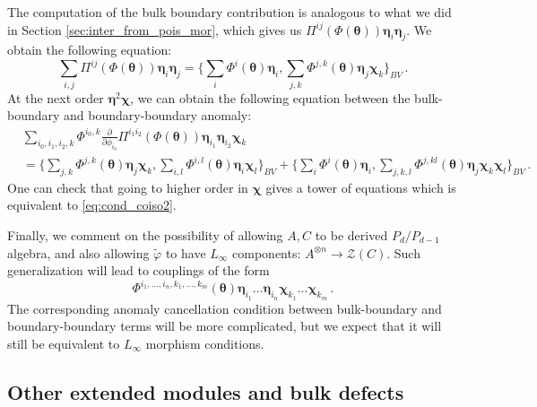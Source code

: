 \documentclass[11pt]{article}
\numberwithin{equation}{section}
\begin{document}
The computation of the bulk boundary contribution is analogous to what we did in Section \ref{sec:inter_from_pois_mor}, which gives us $\Pi^{ij}(\Phi(\boldsymbol{\theta}))\boldsymbol{\eta}_i\boldsymbol{\eta}_j$. We obtain the following equation:
\begin{equation}
	\sum_{i,j}\Pi^{ij}(\Phi(\boldsymbol{\theta}))\boldsymbol{\eta}_i\boldsymbol{\eta}_j = \{\sum_{i}\Phi^i(\boldsymbol{\theta})\boldsymbol{\eta}_i, \sum_{j,k}\Phi^{j,k}(\boldsymbol{\theta})\boldsymbol{\eta}_j\boldsymbol{\chi}_k\}_{BV}\,.
\end{equation}
At the next order $\boldsymbol{\eta}^2\boldsymbol{\chi}$, we can obtain the following equation between the bulk-boundary and boundary-boundary anomaly:
\begin{equation}
\begin{aligned}
	    &\sum_{i_0,i_1,i_2,k}\Phi^{i_0,k}\frac{\partial}{\partial\phi_{i_0}}\Pi^{i_1i_2}(\Phi(\boldsymbol{\theta}))\boldsymbol{\eta}_{i_1}\boldsymbol{\eta}_{i_2}\boldsymbol{\chi}_k \\
		&= \{\sum_{j,k}\Phi^{j,k}(\boldsymbol{\theta})\boldsymbol{\eta}_j\boldsymbol{\chi}_k, \sum_{i,l}\Phi^{i,l}(\boldsymbol{\theta})\boldsymbol{\eta}_i\boldsymbol{\chi}_l\}_{BV} + \{\sum_{i}\Phi^i(\boldsymbol{\theta})\boldsymbol{\eta}_i, \sum_{j,k,l}\Phi^{j,kl}(\boldsymbol{\theta})\boldsymbol{\eta}_j\boldsymbol{\chi}_k\boldsymbol{\chi}_l\}_{BV}\,.
\end{aligned}
\end{equation}
One can check that going to higher order in $\boldsymbol{\chi}$ gives a tower of equations which is equivalent to \eqref{eq:cond_coiso2}. 

Finally, we comment on the possibility of allowing $A,C$ to be derived $P_d/P_{d-1}$ algebra, and also allowing $\widetilde{\varphi}$ to have $L_\infty$ components: $A^{\otimes n}\to \mathcal{Z}(C)$. Such generalization will lead to couplings of the form 
\begin{equation}
	\Phi^{i_1,\dots,i_n, k_1,\dots,k_m}(\boldsymbol{\theta})\boldsymbol{\eta}_{i_1}\dots \boldsymbol{\eta}_{i_n} \boldsymbol{\chi}_{k_1}\dots \boldsymbol{\chi}_{k_m}\,.
\end{equation}
The corresponding anomaly cancellation condition between bulk-boundary and boundary-boundary terms will be more complicated, but we expect that it will still be equivalent to $L_\infty$ morphism conditions.


\subsection{Other extended modules and bulk defects}
\label{sec:ex_defect_modules}
\end{document}
